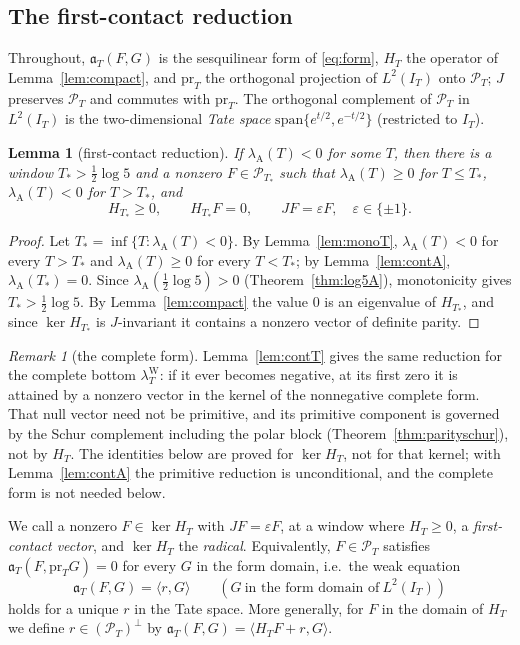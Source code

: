 \documentclass[11pt]{amsart}
\newtheorem{lemma}[theorem]{Lemma}
\theoremstyle{definition}
\theoremstyle{remark}
\newtheorem{remark}[theorem]{Remark}
\newcommand{\PT}{\mathcal P_T}
\newcommand{\IT}{I_T}
\newcommand{\lamW}{\lambda^{\mathrm W}_T}
\newcommand{\lamA}{\lambda_{\mathrm A}(T)}
\begin{document}
\subsection{The first-contact reduction}
Throughout, $\mathfrak a_T(F,G)$ is the sesquilinear form of \eqref{eq:form}, $H_T$ the operator of
Lemma~\ref{lem:compact}, and $\mathrm{pr}_T$ the orthogonal projection of $L^2(\IT)$ onto $\PT$; $J$ preserves
$\PT$ and commutes with $\mathrm{pr}_T$. The orthogonal complement of $\PT$ in $L^2(\IT)$ is the
two-dimensional \emph{Tate space} $\mathrm{span}\{e^{t/2},e^{-t/2}\}$ (restricted to $\IT$).

\begin{lemma}[first-contact reduction]\label{lem:firstcontact}
If $\lamA<0$ for some $T$, then there is a window $T_*>\frac12\log5$ and a nonzero $F\in\mathcal P_{T_*}$ such
that $\lambda_{\mathrm A}(T)\ge0$ for $T\le T_*$, $\lambda_{\mathrm A}(T)<0$ for $T>T_*$, and
\[
 H_{T_*}\ge0,\qquad H_{T_*}F=0,\qquad JF=\varepsilon F,\quad \varepsilon\in\{\pm1\}.
\]
\end{lemma}
\begin{proof}
Let $T_*=\inf\{T:\lamA<0\}$. By Lemma~\ref{lem:monoT}, $\lamA<0$ for every $T>T_*$ and $\lamA\ge0$ for every
$T<T_*$; by Lemma~\ref{lem:contA}, $\lambda_{\mathrm A}(T_*)=0$. Since $\lambda_{\mathrm A}(\frac12\log5)>0$
(Theorem~\ref{thm:log5A}), monotonicity gives $T_*>\frac12\log5$. By Lemma~\ref{lem:compact} the value $0$ is
an eigenvalue of $H_{T_*}$, and since $\ker H_{T_*}$ is $J$-invariant it contains a nonzero vector of
definite parity.
\end{proof}

\begin{remark}[the complete form]\label{rem:completecontact}
Lemma~\ref{lem:contT} gives the same reduction for the complete bottom $\lamW$: if it ever becomes negative, at its
first zero it is attained by a nonzero vector in the kernel of the nonnegative complete form. That null vector need
not be primitive, and its primitive component is governed by the Schur complement including the polar block
(Theorem~\ref{thm:parityschur}), not by $H_T$. The identities below are proved for $\ker H_T$, not for that kernel;
with Lemma~\ref{lem:contA} the primitive reduction is unconditional, and the complete form is not needed below.
\end{remark}



We call a nonzero $F\in\ker H_T$ with $JF=\varepsilon F$, at a window where $H_T\ge0$, a
\emph{first-contact vector}, and $\ker H_T$ the \emph{radical}. Equivalently, $F\in\PT$ satisfies
$\mathfrak a_T(F,\mathrm{pr}_TG)=0$ for every $G$ in the form domain, i.e.\ the weak equation
\begin{equation}\label{eq:localweak}
 \mathfrak a_T(F,G)=\langle r,G\rangle\qquad(G\ \text{in the form domain of}\ L^2(\IT))
\end{equation}
holds for a unique $r$ in the Tate space. More generally, for $F$ in the domain of $H_T$ we define
$r\in(\PT)^\perp$ by $\mathfrak a_T(F,G)=\langle H_TF+r,G\rangle$.
\end{document}
